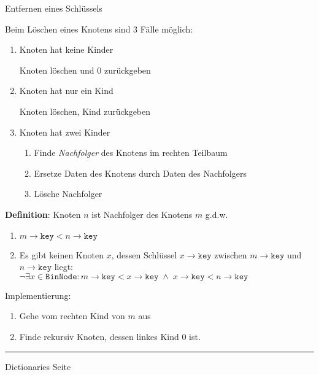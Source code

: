 \begin{slide}{}
\normalsize

\begin{center}
Entfernen eines Schl\"ussels
\end{center}
\vspace*{0.5cm}

\footnotesize
Beim L\"oschen eines Knotens sind 3 F\"alle m\"oglich:
\begin{enumerate}
\item Knoten hat keine Kinder

      Knoten l\"oschen und 0 zur\"uckgeben
\item Knoten hat nur ein Kind

      Knoten l\"oschen, Kind zur\"uckgeben
\item Knoten hat zwei Kinder
  \begin{enumerate}
  \item Finde \emph{Nachfolger} des Knotens im rechten Teilbaum
  \item Ersetze Daten des Knotens durch Daten des Nachfolgers
  \item L\"osche Nachfolger
  \end{enumerate}
\end{enumerate}

\textbf{Definition}: Knoten $n$ ist Nachfolger des Knotens $m$ g.d.w.
\begin{enumerate}
\item $m\rightarrow\mathtt{key} < n\rightarrow\mathtt{key}$
\item Es gibt keinen Knoten $x$, dessen Schl\"ussel $x\rightarrow\mathtt{key}$ zwischen  
      $m\rightarrow\mathtt{key}$ und $n\rightarrow\mathtt{key}$ liegt: \\[0.3cm]
     \hspace*{-1.3cm}
 $\neg \exists x \in \mathtt{BinNode}: m\rightarrow\mathtt{key} < x\rightarrow\mathtt{key} \;\wedge\; x\rightarrow\mathtt{key} < n\rightarrow\mathtt{key}$
\end{enumerate}
Implementierung: 
\begin{enumerate}
\item Gehe vom rechten Kind von $m$ aus
\item Finde rekursiv Knoten, dessen linkes Kind 0 ist.
\end{enumerate}

\vspace*{\fill}
\tiny \addtocounter{mypage}{1}
\rule{17cm}{1mm}
Dictionaries  \hspace*{\fill} Seite 
\end{slide}

